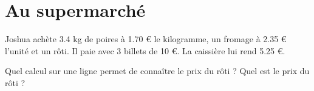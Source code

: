 \section{Au supermarché}

Joshua achète \num{3.4} kg de poires à \num{1,70} € le kilogramme, un fromage à \num{2.35} € l'unité et un rôti.
Il paie avec 3 billets de 10 €. La caissière lui rend \num{5.25} €.

\begin{questions}
	\question Quel calcul sur une ligne permet de connaître le prix du rôti ?
	\question Quel est le prix du rôti ?
\end{questions}